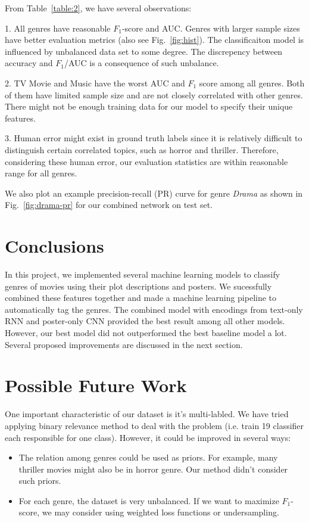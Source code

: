 \documentclass[12pt]{article} %
\begin{document}
From Table~\ref{table:2}, we have several observations:

1. All genres have reasonable $F_1$-score and AUC. Genres with larger sample sizes have better evaluation metrics (also see Fig.~\ref{fig:hist}). The classificaiton model is influenced by unbalanced data set to some degree. The discrepency between accuracy and $F_1$/AUC is a consequence of such unbalance.

2. TV Movie and Music have the worst AUC and $F_1$ score among all genres. Both of them have limited sample size and are not closely correlated with other genres. There might not be enough training data for our model to specify their unique features.

3. Human error might exist in ground truth labels since it is relatively difficult to distinguish certain correlated topics, such as horror and thriller. Therefore, considering these human error, our evaluation statistics are within reasonable range for all genres.
 
We also plot an example precision-recall (PR) curve for genre {\it Drama} as shown in Fig.~\ref{fig:drama-pr} for our combined network on test set.

\section{Conclusions}
In this project, we implemented several machine learning models to classify genres of movies using their plot descriptions and posters. We sucessfully combined these features together and made a machine learning pipeline to automatically tag the genres. The combined model with encodings from text-only RNN and poster-only CNN provided the best result among all other models. However, our best model did not outperformed the best baseline model a lot. Several proposed improvements are discussed in the next section. 

\section{Possible Future Work}
One important characteristic of our dataset is it's multi-labled. We have tried applying binary relevance method to deal with the problem (i.e. train 19 classifier each responsible for one class). However, it could be improved in several ways:
\begin{itemize}
  \item The relation among genres could be used as priors. For example, many thriller movies might also be in horror genre. Our method didn't consider such priors.
  \item For each genre, the dataset is very unbalanced. If we want to maximize $F_1$-score, we may consider using weighted loss functions or undersampling.

\end{itemize}
\end{document}
